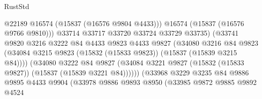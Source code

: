 \begin{lexlean}{RustStd}
\begin{coremodule}
{\begin{coremodule}
{{{{{{{{{{{{{{{{{{{{{{{{{{{{{{{{{{{{{{{{{{{{{{{{{{{{{{{{{{{{                                          @22189
                                          @16574
                                          (@15837 (@16576 @9804 @4433)))
                                        @16574
                                        (@15837 (@16576 @9766 @9810)))
                                      @33714
                                      @33717
                                      @33720
                                      @33724
                                      @33729
                                      @33735)
                                    (@33741
                                      @9820
                                      @3216
                                      @3222
                                      @84
                                      @4433
                                      @9823
                                      @4433
                                      @9827
                                      (@34080
                                        @3216
                                        @84
                                        @9823
                                        (@34084
                                          @3215
                                          @9823
                                          (@15832 (@15833 @9823))
                                          (@15837 (@15839 @3215 @84))))
                                      (@34080
                                        @3222
                                        @84
                                        @9827
                                        (@34084
                                          @3221
                                          @9827
                                          (@15832 (@15833 @9827))
                                          (@15837 (@15839 @3221 @84))))))
                                  (@33968
                                    @3229
                                    @3235
                                    @84
                                    @9886
                                    @9895
                                    @4433
                                    @9904
                                    (@33978
                                      @9886
                                      @9893
                                      @8950
                                      (@33985
                                        @9872
                                        @9885
                                        @9892
                                        @4524
}}}}}}}}}}}}}}}}}}}}}}}}}}}}}}}}}}}}}}}}}}}}}}}}}}}}}}}}}}}}
\end{coremodule}}
\end{coremodule}
\end{lexlean}
